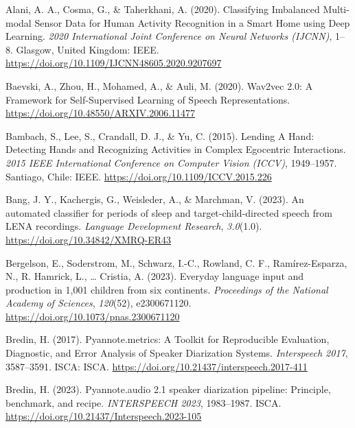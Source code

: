\documentclass[
  man,floatsintext]{apa6}
\newlength{\cslhangindent}
\newenvironment{CSLReferences}[2] %
 {\begin{list}{}{%
  \setlength{\itemindent}{0pt}
  \setlength{\leftmargin}{0pt}
  \setlength{\parsep}{0pt}
  \ifodd #1
   \setlength{\leftmargin}{\cslhangindent}
   \setlength{\itemindent}{-1\cslhangindent}
  \fi
  \setlength{\itemsep}{#2\baselineskip}}}
 {\end{list}}
\begin{document}
\label{refs}
\begin{CSLReferences}{1}{0}
Alani, A. A., Cosma, G., \& Taherkhani, A. (2020). Classifying {Imbalanced Multi-modal Sensor Data} for {Human Activity Recognition} in a {Smart Home} using {Deep Learning}. \emph{2020 {International Joint Conference} on {Neural Networks} ({IJCNN})}, 1--8. Glasgow, United Kingdom: IEEE. \url{https://doi.org/10.1109/IJCNN48605.2020.9207697}

Baevski, A., Zhou, H., Mohamed, A., \& Auli, M. (2020). Wav2vec 2.0: {A Framework} for {Self-Supervised Learning} of {Speech Representations}. \url{https://doi.org/10.48550/ARXIV.2006.11477}

Bambach, S., Lee, S., Crandall, D. J., \& Yu, C. (2015). Lending {A Hand}: {Detecting Hands} and {Recognizing Activities} in {Complex Egocentric Interactions}. \emph{2015 {IEEE International Conference} on {Computer Vision} ({ICCV})}, 1949--1957. Santiago, Chile: IEEE. \url{https://doi.org/10.1109/ICCV.2015.226}

Bang, J. Y., Kachergis, G., Weisleder, A., \& Marchman, V. (2023). An automated classifier for periods of sleep and target-child-directed speech from {LENA} recordings. \emph{Language Development Research}, \emph{3.0}(1.0). \url{https://doi.org/10.34842/XMRQ-ER43}

Bergelson, E., Soderstrom, M., Schwarz, I.-C., Rowland, C. F., Ramírez-Esparza, N., R. Hamrick, L., \ldots{} Cristia, A. (2023). Everyday language input and production in 1,001 children from six continents. \emph{Proceedings of the National Academy of Sciences}, \emph{120}(52), e2300671120. \url{https://doi.org/10.1073/pnas.2300671120}

Bredin, H. (2017). Pyannote.metrics: {A Toolkit} for {Reproducible Evaluation}, {Diagnostic}, and {Error Analysis} of {Speaker Diarization Systems}. \emph{Interspeech 2017}, 3587--3591. ISCA: ISCA. \url{https://doi.org/10.21437/interspeech.2017-411}

Bredin, H. (2023). Pyannote.audio 2.1 speaker diarization pipeline: Principle, benchmark, and recipe. \emph{{INTERSPEECH} 2023}, 1983--1987. ISCA. \url{https://doi.org/10.21437/Interspeech.2023-105}


\end{CSLReferences}
\end{document}
